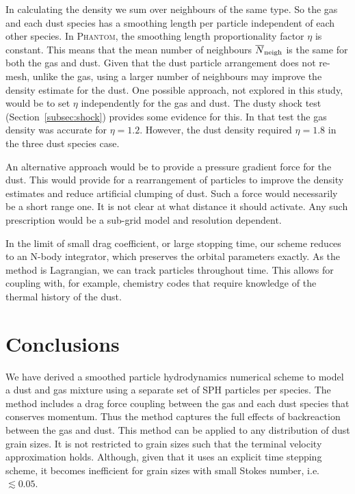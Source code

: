\documentclass[fleqn,usenatbib]{mnras}
\begin{document}
In calculating the density we sum over neighbours of the same type. So the gas
and each dust species has a smoothing length per particle independent of each
other species. In \textsc{Phantom}, the smoothing length proportionality factor
\(\eta\) is constant. This means that the mean number of neighbours
\(\overline{N}_{\rm neigh}\) is the same for both the gas and dust. Given that
the dust particle arrangement does not re-mesh, unlike the gas, using a larger
number of neighbours may improve the density estimate for the dust. One possible
approach, not explored in this study, would be to set \(\eta\) independently for
the gas and dust. The dusty shock test (Section~\ref{subsec:shock}) provides
some evidence for this. In that test the gas density was accurate for \(\eta =
1.2\). However, the dust density required \(\eta = 1.8\) in the three dust
species case.

An alternative approach would be to provide a pressure gradient force for the
dust. This would provide for a rearrangement of particles to improve the density
estimates and reduce artificial clumping of dust. Such a force would necessarily
be a short range one. It is not clear at what distance it should activate. Any
such prescription would be a sub-grid model and resolution dependent.

In the limit of small drag coefficient, or large stopping time, our scheme
reduces to an N-body integrator, which preserves the orbital parameters exactly.
As the method is Lagrangian, we can track particles throughout time. This allows
for coupling with, for example, chemistry codes that require knowledge of the
thermal history of the dust.


\section{Conclusions}

We have derived a smoothed particle hydrodynamics numerical scheme to model a
dust and gas mixture using a separate set of SPH particles per species. The
method includes a drag force coupling between the gas and each dust species that
conserves momentum. Thus the method captures the full effects of backreaction
between the gas and dust. This method can be applied to any distribution of dust
grain sizes. It is not restricted to grain sizes such that the terminal velocity
approximation holds. Although, given that it uses an explicit time stepping
scheme, it becomes inefficient for grain sizes with small Stokes number, i.e.
\(\lesssim 0.05\).
\end{document}

